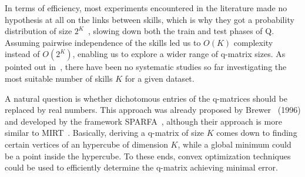 \documentclass{edm_template}
\newcommand\alert[1]{\textcolor{red}{#1}}
\begin{document}
In terms of efficiency, most experiments encountered in the literature made no hypothesis at all on the links between skills, which is why they got a probability distribution of size $2^K$~\cite{Cheng2009, Huebner2010}, slowing down both the train and test phases of Q. Assuming pairwise independence of the skills led us to $O(K)$ complexity instead of $O(2^K)$, enabling us to explore a wider range of q-matrix sizes. As pointed out in~\cite{Huebner2010}, there have been no systematic studies so far investigating the most suitable number of skills $K$ for a given dataset. %





A natural question is whether dichotomous entries of the q-matrices should be replaced by real numbers. This approach was already proposed by Brewer~\cite{Barnes2005} (1996) and developed by the framework SPARFA~\cite{Vats2013}, although their approach is more similar to MIRT~\cite{Segall1996}. Basically, deriving a q-matrix of size $K$ comes down to finding certain vertices of an hypercube of dimension $K$, while a global minimum could be a point inside the hypercube. To these ends, convex optimization techniques could be used to efficiently determine the q-matrix achieving minimal error.
\end{document}
